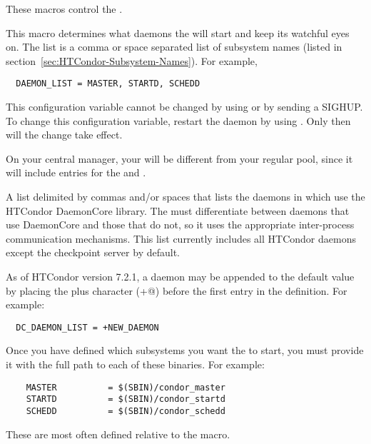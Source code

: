 These macros control the .
\begin{description}
  
\label{param:DaemonList}
\item[\Macro{DAEMON\_LIST}]
  This macro
  determines what daemons the  will start and keep its
  watchful eyes on.  The list is a comma or space separated list of
  subsystem names (listed in
  section~\ref{sec:HTCondor-Subsystem-Names}).  For example,
\begin{verbatim}
  DAEMON_LIST = MASTER, STARTD, SCHEDD
\end{verbatim}

  \Note This configuration variable cannot be changed 
  by using  or 
  by sending a SIGHUP.
  To change this configuration variable, restart the
   daemon
  by using .
  Only then will the change take effect.

  \Note On your central manager, your 
  will be different from your regular pool, since it will include
  entries for the  and .  
  
\label{param:DCDaemonList}
\item[\Macro{DC\_DAEMON\_LIST}]
  A list delimited by commas and/or spaces that
  lists the daemons in  which use the HTCondor
  DaemonCore library.  The  must differentiate between
  daemons that use DaemonCore and those that do not,
  so it uses the appropriate inter-process communication mechanisms.
  This list currently includes all HTCondor daemons except the checkpoint server
  by default.

  As of HTCondor version 7.2.1, a daemon may be appended to the default
   value by placing the plus character
  (\verb@+@) before the first entry in the  
  definition.
  For example:
\begin{verbatim}
  DC_DAEMON_LIST = +NEW_DAEMON
\end{verbatim}

\label{param:SUBSYS}
\item[\MacroB{<SUBSYS>}]
  Once you have defined which
  subsystems you want the  to start, you must provide
  it with the full path to each of these binaries.  For example:
  \begin{verbatim}
    MASTER          = $(SBIN)/condor_master
    STARTD          = $(SBIN)/condor_startd
    SCHEDD          = $(SBIN)/condor_schedd
  \end{verbatim}
  These are most often defined relative to the  macro.


\end{description}
